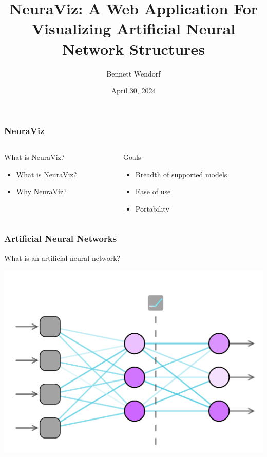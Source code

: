 \documentclass{beamer}
\title{NeuraViz: A Web Application For Visualizing Artificial Neural Network Structures}
\author{Bennett Wendorf}
\institute{University of Wisconsin - La Crosse}
\date{April 30, 2024}
\begin{document}
 
\frame{\titlepage}

\begin{frame}
    \frametitle{NeuraViz}
    \begin{columns}
        \begin{column}{0.5\textwidth}
            \begin{block}{What is NeuraViz?}
                \begin{itemize}
                    \item What is NeuraViz? \pause
                    \item Why NeuraViz?
                \end{itemize}
            \end{block}
        \end{column}
        \pause
        \begin{column}{0.5\textwidth}
            \begin{block}{Goals}
                \begin{itemize}
                    \item Breadth of supported models \pause
                    \item Ease of use \pause
                    \item Portability
                \end{itemize}
            \end{block}
        \end{column}
    \end{columns}
\end{frame}

\begin{frame}
    \frametitle{Artificial Neural Networks}
    \begin{block}{}
        What is an artificial neural network?
    \end{block}
    \pause
    \centering
    \includegraphics[scale=0.18]{../01_introduction/res/neural_network.png}
\end{frame}
    
\end{document}
